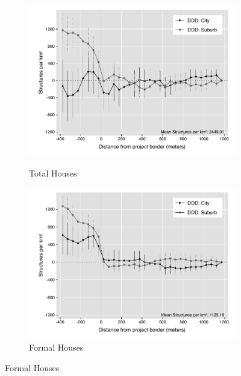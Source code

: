 \documentclass[12pt]{article}
\begin{document}
\begin{figure}[t!]
    \centering
    \vspace{2mm}
    \begin{subfigure}[b]{0.49\textwidth}
        \centering
        \caption[]{\small Total Houses}  
        \vspace{-1mm}
        \includegraphics[width=\textwidth,trim={.5cm .3cm .3cm 0cm}, clip=true]{figures/distplotDDD_bblu_total_buildings_admin_het_5.pdf}
        \label{fig:DDDtotal_het}
    \end{subfigure}
    \hfill
    \begin{subfigure}[b]{0.49\textwidth}  
        \centering 
        \caption[]{\small Formal Houses}
        \vspace{-1mm}
        \includegraphics[width=\textwidth,trim={.5cm .3cm .3cm 0cm}, clip=true]{figures/distplotDDD_bblu_for_admin_het_5.pdf}     

\end{subfigure}
\end{figure}
\end{document}
